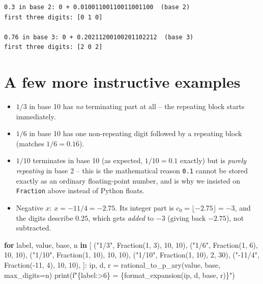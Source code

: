 \documentclass[
  letterpaper,
  DIV=11,
  numbers=noendperiod]{scrreprt}
\newenvironment{Shaded}{\begin{snugshade}}{\end{snugshade}}
\newcommand{\BuiltInTok}[1]{\textcolor[rgb]{0.00,0.23,0.31}{#1}}
\newcommand{\ControlFlowTok}[1]{\textcolor[rgb]{0.00,0.23,0.31}{\textbf{#1}}}
\newcommand{\DecValTok}[1]{\textcolor[rgb]{0.68,0.00,0.00}{#1}}
\newcommand{\KeywordTok}[1]{\textcolor[rgb]{0.00,0.23,0.31}{\textbf{#1}}}
\newcommand{\NormalTok}[1]{\textcolor[rgb]{0.00,0.23,0.31}{#1}}
\newcommand{\OperatorTok}[1]{\textcolor[rgb]{0.37,0.37,0.37}{#1}}
\newcommand{\SpecialCharTok}[1]{\textcolor[rgb]{0.37,0.37,0.37}{#1}}
\newcommand{\SpecialStringTok}[1]{\textcolor[rgb]{0.13,0.47,0.30}{#1}}
\newcommand{\StringTok}[1]{\textcolor[rgb]{0.13,0.47,0.30}{#1}}
\providecommand{\tightlist}{%
  \setlength{\itemsep}{0pt}\setlength{\parskip}{0pt}}
\theoremstyle{plain}
\theoremstyle{plain}
\theoremstyle{definition}
\theoremstyle{definition}
\theoremstyle{definition}
\theoremstyle{plain}
\theoremstyle{plain}
\theoremstyle{remark}
\begin{document}
\begin{verbatim}
0.3 in base 2: 0 + 0.01001100110011001100  (base 2)
first three digits: [0 1 0]

0.76 in base 3: 0 + 0.20211200100201102212  (base 3)
first three digits: [2 0 2]
\end{verbatim}

\section{A few more instructive
examples}\label{a-few-more-instructive-examples}

\begin{itemize}
\tightlist
\item
  \(1/3\) in base 10 has \emph{no} terminating part at all -- the
  repeating block starts immediately.
\item
  \(1/6\) in base 10 has one non-repeating digit followed by a repeating
  block (matches \(1/6 = 0.1\overline{6}\)).
\item
  \(1/10\) terminates in base 10 (as expected, \(1/10 = 0.1\) exactly)
  but is \emph{purely repeating} in base 2 -- this is the mathematical
  reason \texttt{0.1} cannot be stored exactly as an ordinary
  floating-point number, and is why we insisted on \texttt{Fraction}
  above instead of Python floats.
\item
  Negative \(x\): \(x = -11/4 = -2.75\). Its integer part is
  \(c_0 = \lfloor -2.75\rfloor = -3\), and the digits describe \(0.25\),
  which gets \emph{added} to \(-3\) (giving back \(-2.75\)), not
  subtracted.
\end{itemize}

\begin{Shaded}
\begin{Highlighting}[]
\ControlFlowTok{for}\NormalTok{ label, value, base, n }\KeywordTok{in}\NormalTok{ [}
\NormalTok{    (}\StringTok{"1/3"}\NormalTok{, Fraction(}\DecValTok{1}\NormalTok{, }\DecValTok{3}\NormalTok{), }\DecValTok{10}\NormalTok{, }\DecValTok{10}\NormalTok{),}
\NormalTok{    (}\StringTok{"1/6"}\NormalTok{, Fraction(}\DecValTok{1}\NormalTok{, }\DecValTok{6}\NormalTok{), }\DecValTok{10}\NormalTok{, }\DecValTok{10}\NormalTok{),}
\NormalTok{    (}\StringTok{"1/10"}\NormalTok{, Fraction(}\DecValTok{1}\NormalTok{, }\DecValTok{10}\NormalTok{), }\DecValTok{10}\NormalTok{, }\DecValTok{10}\NormalTok{),}
\NormalTok{    (}\StringTok{"1/10"}\NormalTok{, Fraction(}\DecValTok{1}\NormalTok{, }\DecValTok{10}\NormalTok{), }\DecValTok{2}\NormalTok{, }\DecValTok{30}\NormalTok{),}
\NormalTok{    (}\StringTok{"{-}11/4"}\NormalTok{, Fraction(}\OperatorTok{{-}}\DecValTok{11}\NormalTok{, }\DecValTok{4}\NormalTok{), }\DecValTok{10}\NormalTok{, }\DecValTok{10}\NormalTok{),}
\NormalTok{]:}
\NormalTok{    ip, d, r }\OperatorTok{=}\NormalTok{ rational\_to\_p\_ary(value, base, max\_digits}\OperatorTok{=}\NormalTok{n)}
    \BuiltInTok{print}\NormalTok{(}\SpecialStringTok{f"}\SpecialCharTok{\{}\NormalTok{label}\SpecialCharTok{:\textgreater{}6\}}\SpecialStringTok{ = }\SpecialCharTok{\{}\NormalTok{format\_expansion(ip, d, base, r)}\SpecialCharTok{\}}\SpecialStringTok{"}\NormalTok{)}
\end{Highlighting}
\end{Shaded}
\end{document}
